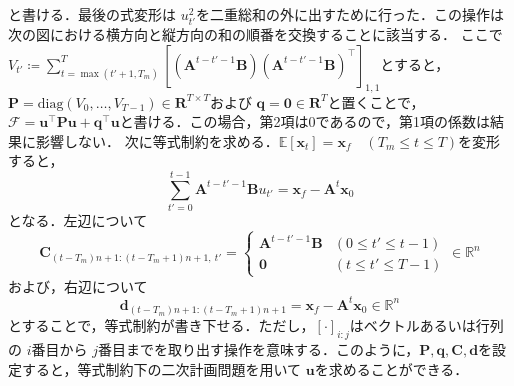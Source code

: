 と書ける．最後の式変形は $u_{t'}^2$を二重総和の外に出すために行った．この操作は次の図における横方向と縦方向の和の順番を交換することに該当する．
ここで $V_{t'}\coloneqq \sum_{t=\max(t'+1, T_m)}^{T} \left[\left(\mathbf{A}^{t-t'-1} \mathbf{B}\right)\left(\mathbf{A}^{t-t'-1} \mathbf{B}\right)^{\top} \right]_{1,1}$とすると，$\mathbf{P}=\mathrm{diag}(V_0, \ldots, V_{T-1})\in \mathbf{R}^{T\times T}$および $\mathbf{q}=\mathbf{0} \in \mathbf{R}^{T}$と置くことで，$\mathcal{F}=\mathbf{u}^\top \mathbf{P}\mathbf{u}+\mathbf{q} ^{\top}\mathbf{u}$と書ける．この場合，第2項は0であるので，第1項の係数は結果に影響しない．
次に等式制約を求める．$\mathbb{E}\left[\mathbf{x}_{t}\right] = \mathbf{x}_f\quad (T_m\leq t \leq T)$を変形すると，
\begin{equation}
\sum_{t'=0}^{t-1} \mathbf{A}^{t-t'-1} \mathbf{B} u_{t'}=\mathbf{x}_f-\mathbf{A}^{t} \mathbf{x}_{0}
\end{equation}
となる．左辺について
\begin{equation}
\mathbf{C}_{(t-T_m)n+1:(t-T_m+1)n+1,\ t'}=
\begin{cases}
    \mathbf{A}^{t-t'-1} \mathbf{B} & (0\leq t'\leq t-1) \\
    \mathbf{0} & (t\leq t'\leq T-1)
\end{cases}\in \mathbb{R}^n 
\end{equation}
および，右辺について
\begin{equation}
\mathbf{d}_{(t-T_m)n+1:(t-T_m+1)n+1}=\mathbf{x}_f-\mathbf{A}^{t} \mathbf{x}_{0} \in \mathbb{R}^n 
\end{equation}
とすることで，等式制約が書き下せる．ただし，$[\cdot]_{i:j}$はベクトルあるいは行列の $i$番目から $j$番目までを取り出す操作を意味する．このように，$\mathbf{P}, \mathbf{q}, \mathbf{C}, \mathbf{d}$を設定すると，等式制約下の二次計画問題を用いて $\mathbf{u}$を求めることができる．
